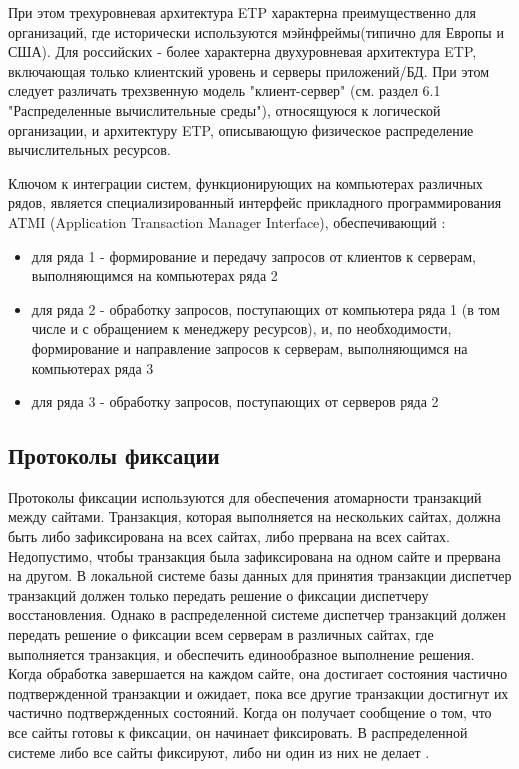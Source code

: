 При этом трехуровневая архитектура ETP характерна преимущественно для организаций, где исторически используются мэйнфреймы(типично для Европы 
и США). Для российских - более характерна двухуровневая архитектура ETP, включающая только клиентский уровень и серверы приложений/БД. При 
этом следует различать трехзвенную модель "клиент-сервер" (см. раздел 6.1 "Распределенные вычислительные среды"), относящуюся к логической 
организации, и архитектуру ETP, описывающую физическое распределение вычислительных ресурсов.

Ключом к интеграции систем, функционирующих на компьютерах различных рядов, является специализированный
интерфейс прикладного программирования ATMI (Application Transaction Manager Interface), обеспечивающий \autocite{TransactionMonitors}:
\begin{itemize}
    \item для ряда 1 - формирование и передачу запросов от клиентов к серверам, выполняющимся на компьютерах ряда 2
    \item для ряда 2 - обработку запросов, поступающих от компьютера ряда 1 (в том числе и с
    обращением к менеджеру ресурсов), и, по необходимости, формирование и направление
    запросов к серверам, выполняющимся на компьютерах ряда 3
    \item для ряда 3 - обработку запросов, поступающих от серверов ряда 2
\end{itemize}

\subsection{Протоколы фиксации}

Протоколы фиксации используются для обеспечения атомарности транзакций между сайтами.
Транзакция, которая выполняется на нескольких сайтах, должна быть либо зафиксирована на всех сайтах, либо прервана на всех сайтах.
Недопустимо, чтобы транзакция была зафиксирована на одном сайте и прервана на другом.
В локальной системе базы данных для принятия транзакции диспетчер транзакций должен только передать решение
о фиксации диспетчеру восстановления. Однако в распределенной системе диспетчер транзакций должен передать
решение о фиксации всем серверам в различных сайтах, где выполняется транзакция, и обеспечить
единообразное выполнение решения. Когда обработка завершается на каждом сайте, она достигает состояния
частично подтвержденной транзакции и ожидает, пока все другие транзакции достигнут их частично подтвержденных состояний.
Когда он получает сообщение о том, что все сайты готовы к фиксации, он начинает фиксировать.
В распределенной системе либо все сайты фиксируют, либо ни один из них не делает \autocite{FixProtocols}.

